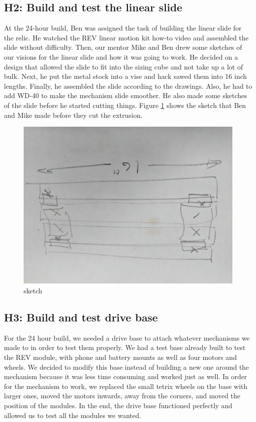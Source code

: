 \documentclass{article}
\begin{document}
\subsection{H2: Build and test the linear slide}

At the 24-hour build,  Ben was assigned the task of building the linear slide for the relic. He watched the REV linear motion kit how-to video and assembled the slide without difficulty. Then, our mentor Mike and Ben drew some sketches of our visions for the linear slide and how it was going to work. He decided on a design that allowed the slide to fit into the sizing cube and not take up a lot of bulk. Next, he put the metal stock into a vise and hack sawed them into 16 inch lengths. Finally, he assembled the slide according to the drawings. Also, he had to add WD-40 to make the mechanism slide smoother. He also made some sketches of the slide before he started cutting things. Figure \ref{fig:sketch} shows the sketch that Ben and Mike made before they cut the extrusion.
\begin{figure}[h]
    \centering
    \includegraphics[width=.6\textwidth]{01/images/Sketch2.jpg}
    \caption{sketch}
    \label{fig:sketch}
\end{figure}

\subsection{H3: Build and test drive base}

For the 24 hour build, we needed a drive base to attach whatever mechanisms we made to in order to test them properly. We had a test base already built to test the REV module, with phone and battery mounts as well as four motors and wheels. We decided to modify this base instead of building a new one around the mechanism because it was less time consuming and worked just as well. In order for the mechanism to work, we replaced the small tetrix wheels on the base with larger ones, moved the motors inwards, away from the corners, and moved the position of the modules. In the end, the drive base functioned perfectly and allowed us to test all the modules we wanted.
\end{document}
